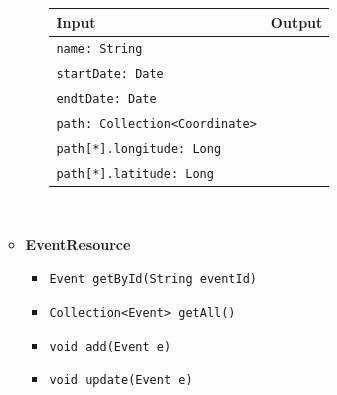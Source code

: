 \documentclass[a4paper, hidelinks, 12pt]{report}
\begin{document}
\begin{itemize}
\begin{itemize}
\begin{itemize}
			\begin{tabular}{l | l}
			\textbf{Input} & \textbf{Output} \\
			\hline
				\verb|name: String| & \\
				\verb|startDate: Date| & \\
				\verb|endtDate: Date| & \\
				\verb|path: Collection<Coordinate>| & \\
				\verb|path[*].longitude: Long| & \\
				\verb|path[*].latitude: Long| & \\
			\end{tabular}\\
					\end{itemize}
					
				\item{\textbf{EventResource}}
					\begin{itemize}
						\item{\verb|Event getById(String eventId)|}
						\item{\verb|Collection<Event> getAll()|}
						\item{\verb|void add(Event e)|}
						\item{\verb|void update(Event e)|}
					\end{itemize}
			\end{itemize}
			

\end{itemize}
\end{document}
